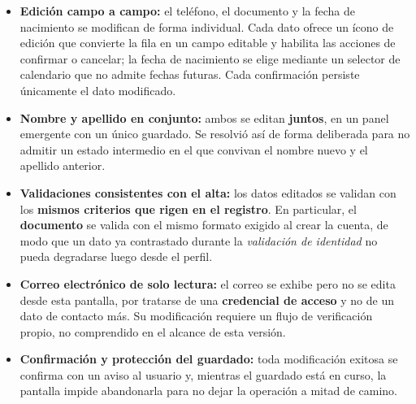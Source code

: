 \documentclass[a4paper,12pt]{article}
\begin{document}
    \begin{itemize}
        \item \textbf{Edición campo a campo:} el teléfono, el documento y la fecha de nacimiento se modifican de forma individual. Cada dato ofrece un ícono de edición que convierte la fila en un campo editable y habilita las acciones de confirmar o cancelar; la fecha de nacimiento se elige mediante un selector de calendario que no admite fechas futuras. Cada confirmación persiste únicamente el dato modificado.
        \item \textbf{Nombre y apellido en conjunto:} ambos se editan \textbf{juntos}, en un panel emergente con un único guardado. Se resolvió así de forma deliberada para no admitir un estado intermedio en el que convivan el nombre nuevo y el apellido anterior.
        \item \textbf{Validaciones consistentes con el alta:} los datos editados se validan con los \textbf{mismos criterios que rigen en el registro}. En particular, el \textbf{documento} se valida con el mismo formato exigido al crear la cuenta, de modo que un dato ya contrastado durante la \textit{validación de identidad} no pueda degradarse luego desde el perfil.
        \item \textbf{Correo electrónico de solo lectura:} el correo se exhibe pero no se edita desde esta pantalla, por tratarse de una \textbf{credencial de acceso} y no de un dato de contacto más. Su modificación requiere un flujo de verificación propio, no comprendido en el alcance de esta versión.
        \item \textbf{Confirmación y protección del guardado:} toda modificación exitosa se confirma con un aviso al usuario y, mientras el guardado está en curso, la pantalla impide abandonarla para no dejar la operación a mitad de camino.
    \end{itemize}
\end{document}
